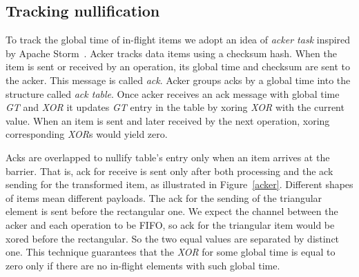 
\label {fs-consistency-seciton}

\subsection{Tracking nullification}



To track the global time of in-flight items we adopt an idea of {\it acker task} inspired by Apache Storm~\cite{apache:storm}. Acker tracks data items using a checksum hash. When the item is sent or received by an operation, its global time and checksum are sent to the acker. This message is called {\it ack}. Acker groups acks by a global time into the structure called {\it ack table}. Once acker receives an ack message with global time {\it GT} and {\it XOR} it updates {\it GT} entry in the table by xoring {\it XOR} with the current value. When an item is sent and later received by the next operation, xoring corresponding {\it XOR}s would yield zero.

Acks are overlapped to nullify table's entry only when an item arrives at the barrier. That is, ack for receive is sent only after both processing and the ack sending for the transformed item, as illustrated in Figure~\ref{acker}. Different shapes of items mean different payloads. The ack for the sending of the triangular element is sent before the rectangular one. We expect the channel between the acker and each operation to be FIFO, so ack for the triangular item would be xored before the rectangular. So the two equal values are separated by distinct one. This technique guarantees that the {\it XOR} for some global time is equal to zero only if there are no in-flight elements with such global time.


